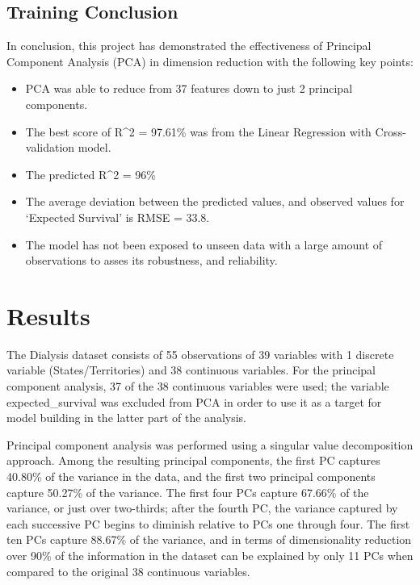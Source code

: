 \documentclass[
  letterpaper,
  DIV=11,
  numbers=noendperiod]{scrreprt}
\begin{document}
\hypertarget{training-conclusion}{%
\section{Training Conclusion}\label{training-conclusion}}

In conclusion, this project has demonstrated the effectiveness of
Principal Component Analysis (PCA) in dimension reduction with the
following key points:

\begin{itemize}
\item
  PCA was able to reduce from 37 features down to just 2 principal
  components.
\item
  The best score of R\^{}2 = 97.61\% was from the Linear Regression with
  Cross-validation model.
\item
  The predicted R\^{}2 = 96\%
\item
  The average deviation between the predicted values, and observed
  values for `Expected Survival' is RMSE = 33.8.
\item
  The model has not been exposed to unseen data with a large amount of
  observations to asses its robustness, and reliability.
\end{itemize}


\hypertarget{results-2}{%
\chapter{Results}\label{results-2}}

The Dialysis dataset consists of 55 observations of 39 variables with 1
discrete variable (States/Territories) and 38 continuous variables. For
the principal component analysis, 37 of the 38 continuous variables were
used; the variable expected\_survival was excluded from PCA in order to
use it as a target for model building in the latter part of the
analysis.

Principal component analysis was performed using a singular value
decomposition approach. Among the resulting principal components, the
first PC captures 40.80\% of the variance in the data, and the first two
principal components capture 50.27\% of the variance. The first four PCs
capture 67.66\% of the variance, or just over two-thirds; after the
fourth PC, the variance captured by each successive PC begins to
diminish relative to PCs one through four. The first ten PCs capture
88.67\% of the variance, and in terms of dimensionality reduction over
90\% of the information in the dataset can be explained by only 11 PCs
when compared to the original 38 continuous variables.
\end{document}
